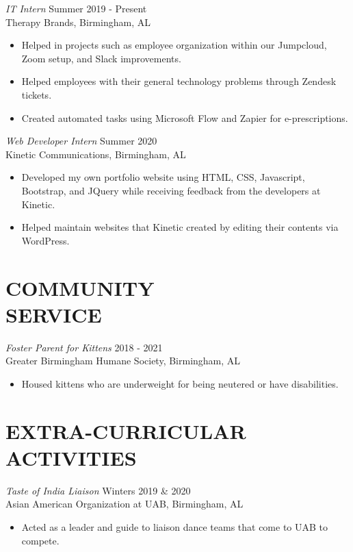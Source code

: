 \documentclass[margin, 10pt]{res} %
\begin{document}
\begin{resume}
{\sl IT Intern} \hfill Summer 2019 - Present \\
Therapy Brands, Birmingham, AL 
\begin{itemize} \itemsep -2pt %
\item Helped in projects such as employee organization within our Jumpcloud, Zoom setup, and Slack improvements.
\item Helped employees with their general technology problems through Zendesk tickets.
\item Created automated tasks using Microsoft Flow and Zapier for e-prescriptions.
\end{itemize} 

{\sl Web Developer Intern} \hfill Summer 2020 \\
Kinetic Communications, Birmingham, AL
\begin{itemize} \itemsep -2pt %
\item Developed my own portfolio website using HTML, CSS, Javascript, Bootstrap, and JQuery while receiving feedback from the developers at Kinetic. 
\item Helped maintain websites that Kinetic created by editing their contents via WordPress. 
\end{itemize}

\section{COMMUNITY \\ SERVICE}

{\sl Foster Parent for Kittens} \hfill 2018 - 2021 \\
Greater Birmingham Humane Society, Birmingham, AL
\begin{itemize}
\item Housed kittens who are underweight for being neutered or have disabilities.
\end{itemize}


\section{EXTRA-CURRICULAR \\ ACTIVITIES} 

{\sl Taste of India Liaison} \hfill Winters 2019 \& 2020 \\
Asian American Organization at UAB, Birmingham, AL
\begin{itemize}
\item Acted as a leader and guide to liaison dance teams that come to UAB to compete.
\end{itemize}


\end{resume}
\end{document}
